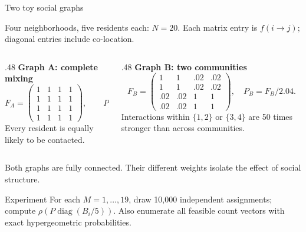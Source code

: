 \begin{frame}{Two toy social graphs}
\small

Four neighborhoods, five residents each: $N=20$. Each matrix entry is $f(i\to j)$; diagonal entries include co-location.
\begin{columns}[T]
\begin{column}{.48\textwidth}
\textbf{Graph A: complete mixing}
\[
 F_A=\begin{pmatrix}1&1&1&1\\1&1&1&1\\1&1&1&1\\1&1&1&1\end{pmatrix},\qquad P_A=F_A/4.
\]
Every resident is equally likely to be contacted.
\end{column}
\begin{column}{.48\textwidth}
\textbf{Graph B: two communities}
\[
 F_B=\begin{pmatrix}1&1&.02&.02\\1&1&.02&.02\\.02&.02&1&1\\.02&.02&1&1\end{pmatrix},\quad P_B=F_B/2.04.
\]
Interactions within $\{1,2\}$ or $\{3,4\}$ are 50 times stronger than across communities.
\end{column}
\end{columns}
\medskip
Both graphs are fully connected. Their different weights isolate the effect of social structure.
\begin{block}{Experiment}
For each $M=1,\ldots,19$, draw 10,000 independent assignments; compute $\rho(P\operatorname{diag}(B_i/5))$. Also enumerate all feasible count vectors with exact hypergeometric probabilities.
\end{block}

\end{frame}

